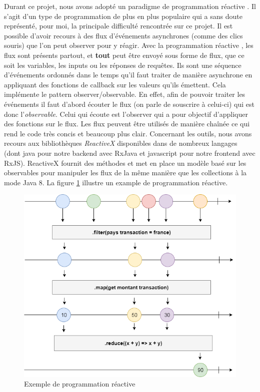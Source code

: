 	Durant ce projet, nous avons adopté un paradigme de programmation réactive \cite{bib_progReac}. Il s'agit d'un type de programmation de plus en plus populaire qui a sans doute représenté, pour moi, la principale difficulté rencontrée sur ce projet. Il est possible d'avoir recours à des flux d'événements asynchrones (comme des clics souris) que l'on peut observer pour y réagir. Avec la programmation réactive \cite{bib_progReac2}, les flux sont présents partout, et \textbf{tout} peut être envoyé sous forme de flux, que ce soit les variables, les inputs ou les réponses de requêtes. Ils sont une séquence d'événements ordonnés dans le temps qu'il faut traiter de manière asynchrone en appliquant des fonctions de callback sur les valeurs qu'ils émettent. Cela implémente le pattern observer/observable. En effet, afin de pouvoir traiter les événements il faut d'abord écouter le flux (on parle de souscrire à celui-ci) qui est donc l'\textit{observable}. Celui qui écoute est l'observer qui a pour objectif d'appliquer des fonctions sur le flux. Les flux peuvent être utilisés de manière chaînée ce qui rend le code très concis et beaucoup plus clair. Concernant les outils, nous avons recours aux bibliothèques \textit{ReactiveX} disponibles dans de nombreux langages (dont java pour notre backend avec RxJava et javascript pour notre frontend avec RxJS). ReactiveX fournit des méthodes et met en place un modèle basé sur les observables pour manipuler les flux de la même manière que les collections à la mode Java 8. La figure \ref{reactivex} illustre un example de programmation réactive.
	
\begin{figure}[h!]
	\includegraphics[scale=0.50]{images/travailBP1818/architecture/reactivex.png}
	\centering
	\caption{Exemple de programmation réactive}
	\label{reactivex}
\end{figure}

